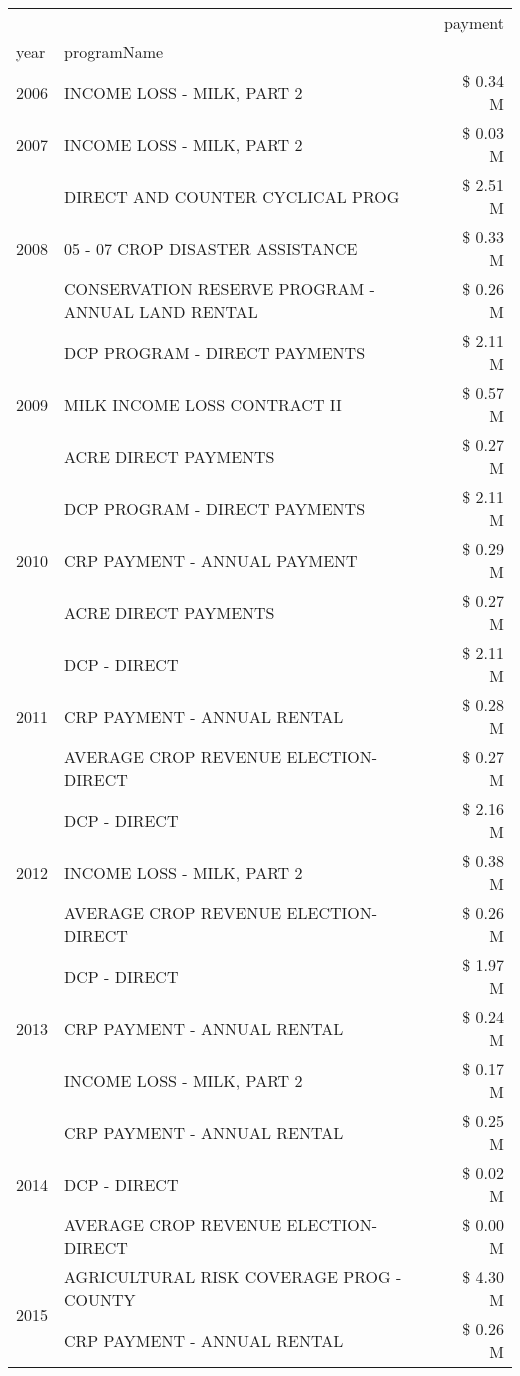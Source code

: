 \begin{tabular}{llr}
\toprule
 &  & payment \\
year & programName &  \\
\midrule
2006 & INCOME LOSS - MILK, PART 2 & \$ 0.34 M \\
\cline{1-3}
2007 & INCOME LOSS - MILK, PART 2 & \$ 0.03 M \\
\cline{1-3}
\multirow[t]{3}{*}{2008} & DIRECT AND COUNTER CYCLICAL PROG & \$ 2.51 M \\
 & 05 - 07 CROP DISASTER ASSISTANCE & \$ 0.33 M \\
 & CONSERVATION RESERVE PROGRAM - ANNUAL LAND RENTAL & \$ 0.26 M \\
\cline{1-3}
\multirow[t]{3}{*}{2009} & DCP PROGRAM - DIRECT PAYMENTS & \$ 2.11 M \\
 & MILK INCOME LOSS CONTRACT II & \$ 0.57 M \\
 & ACRE DIRECT PAYMENTS & \$ 0.27 M \\
\cline{1-3}
\multirow[t]{3}{*}{2010} & DCP PROGRAM - DIRECT PAYMENTS & \$ 2.11 M \\
 & CRP PAYMENT - ANNUAL PAYMENT & \$ 0.29 M \\
 & ACRE DIRECT PAYMENTS & \$ 0.27 M \\
\cline{1-3}
\multirow[t]{3}{*}{2011} & DCP - DIRECT & \$ 2.11 M \\
 & CRP PAYMENT - ANNUAL RENTAL & \$ 0.28 M \\
 & AVERAGE CROP REVENUE ELECTION-DIRECT & \$ 0.27 M \\
\cline{1-3}
\multirow[t]{3}{*}{2012} & DCP - DIRECT & \$ 2.16 M \\
 & INCOME LOSS - MILK, PART 2 & \$ 0.38 M \\
 & AVERAGE CROP REVENUE ELECTION-DIRECT & \$ 0.26 M \\
\cline{1-3}
\multirow[t]{3}{*}{2013} & DCP - DIRECT & \$ 1.97 M \\
 & CRP PAYMENT - ANNUAL RENTAL & \$ 0.24 M \\
 & INCOME LOSS - MILK, PART 2 & \$ 0.17 M \\
\cline{1-3}
\multirow[t]{3}{*}{2014} & CRP PAYMENT - ANNUAL RENTAL & \$ 0.25 M \\
 & DCP - DIRECT & \$ 0.02 M \\
 & AVERAGE CROP REVENUE ELECTION-DIRECT & \$ 0.00 M \\
\cline{1-3}
\multirow[t]{2}{*}{2015} & AGRICULTURAL RISK COVERAGE PROG - COUNTY & \$ 4.30 M \\
 & CRP PAYMENT - ANNUAL RENTAL & \$ 0.26 M \\

\end{tabular}
